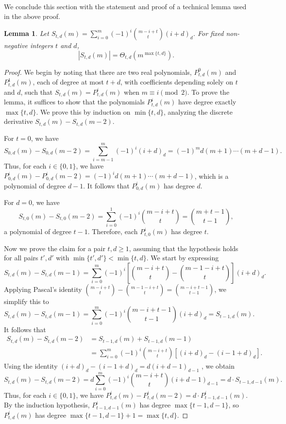 \documentclass[reqno]{amsart}
\theoremstyle{plain}
\newtheorem{lemma}[theorem]{Lemma}
\theoremstyle{definition}
\begin{document}
We conclude this section with the statement and proof of a technical lemma used in the above proof.

\begin{lemma}\label{lem:alternating-sum}
Let $S_{t,d}(m) = \sum_{i=0}^{m} (-1)^i \binom{m-i+t}{t} (i+d)_d$. For fixed non-negative integers $t$ and $d$,
\[
|S_{t,d}(m)| = \Theta_{t,d}(m^{\max\{t,d\}}).
\]
\end{lemma}
\begin{proof}
We begin by noting that there are two real polynomials, $P^{0}_{t,d}(m)$ and $P^{1}_{t,d}(m)$, each of degree at most $t + d$, with coefficients depending solely on $t$ and $d$, such that $S_{t,d}(m) = P^{i}_{t,d}(m)$ when $m \equiv i \pmod{2}$. 
To prove the lemma, it suffices to show that the polynomials $P^{i}_{t,d}(m)$ have degree exactly $\max\{t,d\}$. We prove this by induction on $\min\{t,d\}$, analyzing the discrete derivative $S_{t,d}(m) - S_{t,d}(m-2)$.

For $t = 0$, we have
\[
S_{0,d}(m) - S_{0,d}(m-2) = \sum_{i=m-1}^{m} (-1)^{i} (i+d)_{d} = (-1)^{m} d (m+1) \cdots (m+d-1).
\]
Thus, for each $i \in \{0,1\}$, we have $P^{i}_{0,d}(m) - P^{i}_{0,d}(m-2) = (-1)^{i} d (m+1) \cdots (m+d-1)$, which is a polynomial of degree $d-1$. It follows that $P^{i}_{0,d}(m)$ has degree $d$.

For $d = 0$, we have
\[
S_{t,0}(m) - S_{t,0}(m-2) = \sum_{i=0}^{1} (-1)^{i} \binom{m-i+t}{t} = \binom{m+t-1}{t-1},
\]
a polynomial of degree $t-1$. Therefore, each $P^{i}_{t,0}(m)$ has degree $t$.

Now we prove the claim for a pair $t,d\ge 1$, assuming that the hypothesis holds for all pairs $t',d'$ with $\min\{t',d'\}<\min\{t,d\}$. We start by expressing
\[
S_{t,d}(m) - S_{t,d}(m-1) = \sum_{i=0}^{m} (-1)^{i} \left[ \binom{m-i+t}{t} - \binom{m-1-i+t}{t} \right] (i+d)_d.
\]
Applying Pascal's identity $\binom{m-i+t}{t} - \binom{m-1-i+t}{t}=\binom{m-i+t-1}{t-1}$, we simplify this to
\[
S_{t,d}(m) - S_{t,d}(m-1)= \sum_{i=0}^{m} (-1)^{i} \binom{m-i+t-1}{t-1} (i+d)_d = S_{t-1,d}(m).
\]
It follows that
\begin{align*}
S_{t,d}(m) - S_{t,d}(m-2) &= S_{t-1,d}(m) + S_{t-1,d}(m-1)\\
&= \sum_{i=0}^{m} (-1)^i \binom{m-i+t}{t} \left[ (i+d)_d - (i-1+d)_d \right].
\end{align*}
Using the identity $(i+d)_d - (i-1+d)_d=d(i+d-1)_{d-1}$ , we obtain
\[
S_{t,d}(m) - S_{t,d}(m-2) = d \sum_{i=0}^{m} (-1)^i \binom{m-i+t}{t} (i+d-1)_{d-1} = d \cdot S_{t-1,d-1}(m).
\]
Thus, for each $i \in \{0,1\}$, we have $P^{i}_{t,d}(m) - P^{i}_{t,d}(m-2) = d \cdot P^{i}_{t-1,d-1}(m)$. By the induction hypothesis, $P^{i}_{t-1,d-1}(m)$ has degree $\max\{t-1,d-1\}$, so $P^{i}_{t,d}(m)$ has degree $\max\{t-1,d-1\} + 1 = \max\{t,d\}$.
\end{proof}
\end{document}
